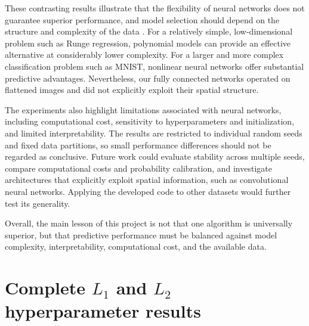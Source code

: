 \documentclass[aps,rmp,reprint,amsmath,amssymb,graphicx,longbibliography]{revtex4-1}
\begin{document}
These contrasting results illustrate that the flexibility of neural networks
does not guarantee superior performance, and model selection
should depend on the structure and complexity of the data
\cite{Book_Ch8}. For a relatively simple, low-dimensional
problem such as Runge regression, polynomial models can provide
an effective alternative at considerably lower complexity.
For a larger and more complex classification problem such as
MNIST, nonlinear neural networks offer substantial predictive
advantages. Nevertheless, our fully connected networks operated
on flattened images and did not explicitly exploit their
spatial structure.

The experiments also highlight limitations associated with
neural networks, including computational cost, sensitivity
to hyperparameters and initialization, and limited
interpretability. The results are restricted to individual
random seeds and fixed data partitions, so small performance
differences should not be regarded as conclusive. Future work
could evaluate stability across multiple seeds, compare
computational costs and probability calibration, and investigate
architectures that explicitly exploit spatial information,
such as convolutional neural networks. Applying the developed
code to other datasets would further test its generality.

Overall, the main lesson of this project is not that one
algorithm is universally superior, but that predictive
performance must be balanced against model complexity,
interpretability, computational cost, and the available data.


\appendix


\section{Complete $L_1$ and $L_2$ hyperparameter results}
\label{app:partd_grid}
\end{document}
